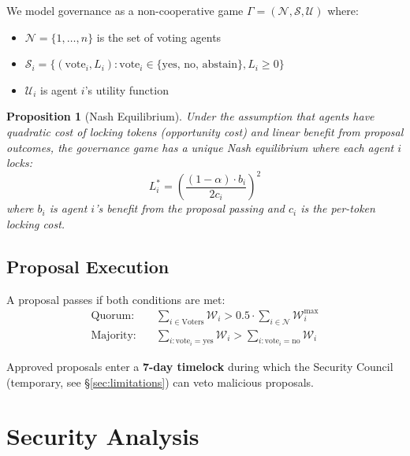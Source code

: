 \documentclass{article}
\newtheorem{proposition}[theorem]{Proposition}
\begin{document}
We model governance as a non-cooperative game $\Gamma = (\mathcal{N}, \mathcal{S}, \mathcal{U})$ where:
\begin{itemize}
    \item $\mathcal{N} = \{1, \ldots, n\}$ is the set of voting agents
    \item $\mathcal{S}_i = \{(\text{vote}_i, L_i) : \text{vote}_i \in \{\text{yes, no, abstain}\}, L_i \geq 0\}$
    \item $\mathcal{U}_i$ is agent $i$'s utility function
\end{itemize}

\begin{proposition}[Nash Equilibrium]
Under the assumption that agents have quadratic cost of locking tokens (opportunity cost) and linear benefit from proposal outcomes, the governance game has a unique Nash equilibrium where each agent $i$ locks:
\begin{equation}
    L_i^* = \left(\frac{(1-\alpha) \cdot b_i}{2c_i}\right)^2
\end{equation}
where $b_i$ is agent $i$'s benefit from the proposal passing and $c_i$ is the per-token locking cost.
\end{proposition}

\subsection{Proposal Execution}

A proposal passes if both conditions are met:
\begin{align}
    \text{Quorum:} \quad & \sum_{i \in \text{Voters}} \mathcal{W}_i > 0.5 \cdot \sum_{i \in \mathcal{N}} \mathcal{W}_i^{\max} \\
    \text{Majority:} \quad & \sum_{i: \text{vote}_i = \text{yes}} \mathcal{W}_i > \sum_{i: \text{vote}_i = \text{no}} \mathcal{W}_i
\end{align}

Approved proposals enter a \textbf{7-day timelock} during which the Security Council (temporary, see \S\ref{sec:limitations}) can veto malicious proposals.


\section{Security Analysis}\label{sec:security}
\end{document}
